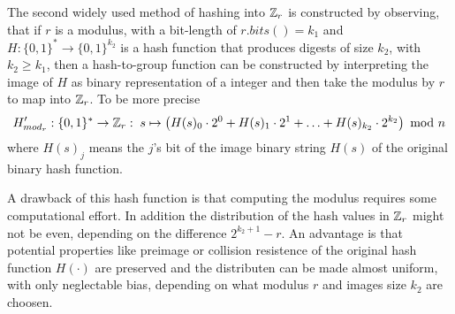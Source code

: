 The second widely used method of hashing into $\mathbb{Z}_r$ is constructed by observing, that if $r$ is a modulus, with a bit-length of $r.bits()=k_1$ and $H:\{0,1\}^*\to \{0,1\}^{k_2}$ is a hash function that produces digests of size $k_2$, with $k_2\geq k_1$, then a hash-to-group function can be constructed by interpreting the image of $H$ as binary representation of a integer and then take the modulus by $r$ to map into $\mathbb{Z}_r$. To be more precise 
\begin{equation}
H'_{mod_r}: \{0,1\}^* \to \mathbb{Z}_r: \; s \mapsto 
\left(H(s)_0\cdot 2^0 + H(s)_1\cdot 2^1 + \ldots + H(s)_{k_2}\cdot 2^{k_2}\right) \text{ mod } n
\end{equation}
where $H(s)_j$ means the $j$'s bit of the image binary string $H(s)$ of the original binary hash function. 

A drawback of this hash function is that computing the modulus requires some computational effort. In addition the distribution of the hash values in $\mathbb{Z}_r$ might not be even, depending on the difference $2^{k_2+1}-r$. An advantage is that potential properties like preimage or collision resistence of the original hash function $H(\cdot)$ are preserved and the distributen can be made almost uniform, with only neglectable bias, depending on what modulus $r$ and images size $k_2$ are choosen.
